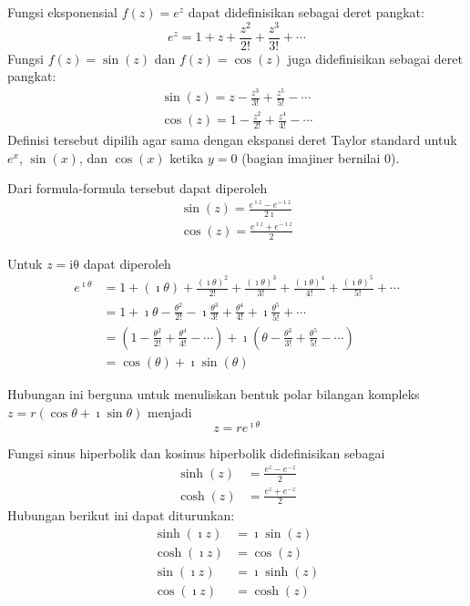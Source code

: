 Fungsi eksponensial $f(z) = e^{z}$ dapat didefinisikan sebagai
deret pangkat:
\begin{equation}
e^{z} = 1 + z + \frac{z^{2}}{2!} + \frac{z^{3}}{3!} + \cdots
\end{equation}
%
Fungsi $f(z) = \sin(z)$ dan $f(z) = \cos(z)$ juga didefinisikan
sebagai deret pangkat:
\begin{align*}
\sin(z) = z - \frac{z^{3}}{3!} + \frac{z^{5}}{5!} - \cdots \\
\cos(z) = 1 - \frac{z^{2}}{2!} + \frac{z^{4}}{4!} - \cdots
\end{align*}
Definisi tersebut dipilih agar sama dengan ekspansi deret Taylor standard
untuk $e^{x}$, $\sin(x)$, dan $\cos(x)$ ketika $y=0$ (bagian imajiner
bernilai 0).

Dari formula-formula tersebut dapat diperoleh
\begin{align}
\sin(z) = \frac{e^{\imath z}-e^{-\imath z}}{2\imath } \\
\cos(z) = \frac{e^{\imath z}+e^{-\imath z}}{2}
\end{align}

Untuk $z = \mathrm{i\theta}$ dapat diperoleh
\begin{align*}
e^{\imath \theta} & = 1 + (\imath \theta) +
  \frac{(\imath \theta)^{2}}{2!} +
  \frac{(\imath \theta)^{3}}{3!} +
  \frac{(\imath \theta)^{4}}{4!} +
  \frac{(\imath \theta)^{5}}{5!} + \cdots \\
 & = 1 + \imath \theta - \frac{\theta^{2}}{2!} - \imath \frac{\theta^{3}}{3!} +
     \frac{\theta^{4}}{4!} + \imath \frac{\theta^{5}}{5!} + \cdots \\
 & = \left(1-\frac{\theta^{2}}{2!}+\frac{\theta^{4}}{4!}-\cdots\right) + \imath \left(\theta-\frac{\theta^{3}}{3!}+\frac{\theta^{5}}{5!}-\cdots\right)\\
 & = \cos(\theta) + \imath  \sin(\theta)
\end{align*}

Hubungan ini berguna untuk menuliskan bentuk polar bilangan kompleks
$z=r(\cos\theta+\imath \sin\theta)$ menjadi
\begin{equation}
z = r e^{\imath \theta}
\end{equation}

Fungsi sinus hiperbolik dan kosinus hiperbolik didefinisikan sebagai
\begin{align}
\sinh(z) & = \frac{e^{z} - e^{-z}}{2} \\
\cosh(z) & = \frac{e^{z} + e^{-z}}{2}
\end{align}
Hubungan berikut ini dapat diturunkan:
\begin{align}
\sinh(\imath z) & = \imath  \sin(z) \\
\cosh(\imath z) & = \cos(z) \\
\sin(\imath z) & = \imath \sinh(z) \\
\cos(\imath z) & = \cosh(z)
\end{align}


